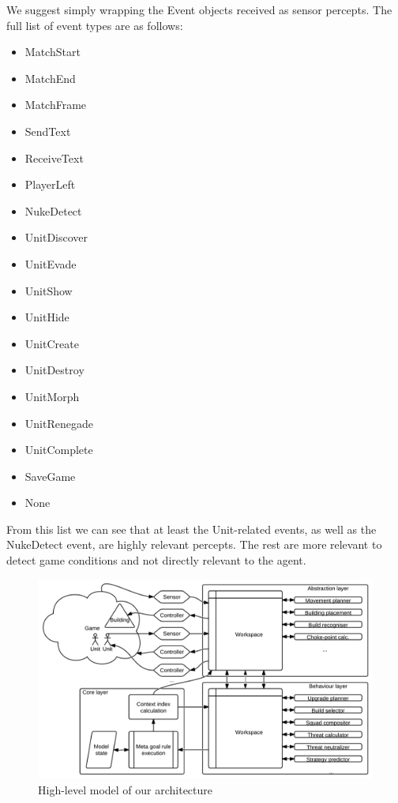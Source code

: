 We suggest simply wrapping the Event objects received as sensor percepts. The
full list of event types are as follows:
\clearpage
\begin{multicols}{2}
\begin{itemize}
    \item MatchStart
    \item MatchEnd
    \item MatchFrame
    \item SendText
    \item ReceiveText
    \item PlayerLeft
    \item NukeDetect
    \item UnitDiscover
    \item UnitEvade
    \item UnitShow
    \item UnitHide
    \item UnitCreate
    \item UnitDestroy
    \item UnitMorph
    \item UnitRenegade
    \item UnitComplete
    \item SaveGame
    \item None 
\end{itemize}
\end{multicols}
From this list we can see that at least the Unit-related events, as well as the
NukeDetect event, are highly relevant percepts. The rest are more relevant to
detect game conditions and not directly relevant to the agent.

\begin{figure}[h!tb]
\centering
\includegraphics[scale=0.8]{graphics/our-architecture.png}
\caption{High-level model of our architecture}
\label{fig:our-architecture}
\end{figure}


